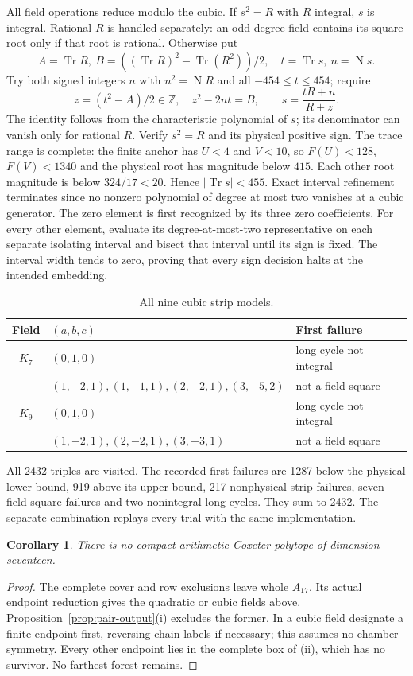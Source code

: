 \documentclass[11pt]{article}
\newtheorem{corollary}[theorem]{Corollary}
\newcommand{\ZZ}{\mathbb Z}
\newcommand{\Tr}{\operatorname{Tr}}
\newcommand{\N}{\operatorname{N}}
\begin{document}
All field operations reduce modulo the cubic. If $s^2=R$ with $R$
integral, $s$ is integral. Rational $R$ is handled separately: an
odd-degree field contains its square root only if that root is
rational. Otherwise put
\[
 A=\Tr R,\ B=((\Tr R)^2-\Tr(R^2))/2,\quad t=\Tr s,\ n=\N s.
\]
Try both signed integers $n$ with $n^2=\N R$ and all
$-454\le t\le454$; require
\[
 z=(t^2-A)/2\in\ZZ,\quad z^2-2nt=B,\qquad
 s=\frac{tR+n}{R+z}.
\]
The identity follows from the characteristic polynomial of $s$;
its denominator can vanish only for rational $R$. Verify $s^2=R$
and its physical positive sign.
The trace range is complete: the finite anchor has $U<4$ and
$V<10$, so $F(U)<128$, $F(V)<1340$ and the physical root
has magnitude below $415$. Each other root magnitude is below
$324/17<20$. Hence $|\Tr s|<455$.
Exact interval refinement terminates since no nonzero polynomial
of degree at most two vanishes at a cubic generator. The zero element
is first recognized by its three zero coefficients. For every other
element, evaluate its degree-at-most-two representative on each separate
isolating interval and bisect that interval until its sign is fixed.
The interval width tends to zero, proving that every sign decision
halts at the intended embedding.

\begin{table}[ht]\centering\small
\begin{tabular}{cll}
\toprule Field&$(a,b,c)$&First failure\\\midrule
$K_7$&$(0,1,0)$&long cycle not integral\\
&$(1,-2,1),(1,-1,1),(2,-2,1),(3,-5,2)$&not a field square\\
$K_9$&$(0,1,0)$&long cycle not integral\\
&$(1,-2,1),(2,-2,1),(3,-3,1)$&not a field square\\\bottomrule
\end{tabular}
\caption{All nine cubic strip models.}\label{tab:cubic}
\end{table}
All 2432 triples are visited. The recorded first failures are
1287 below the physical lower bound, 919 above its upper bound,
217 nonphysical-strip failures, seven field-square failures and
two nonintegral long cycles. They sum to 2432.
The separate combination replays every trial with the same implementation.

\begin{corollary}\label{cor:no17}
There is no compact arithmetic Coxeter polytope of dimension seventeen.
\end{corollary}
\begin{proof}
The complete cover and row exclusions leave whole $A_{17}$.
Its actual endpoint reduction gives the quadratic or cubic fields
above. Proposition~\ref{prop:pair-output}(i) excludes the former.
In a cubic field designate a finite endpoint first, reversing chain
labels if necessary; this assumes no chamber symmetry.
Every other endpoint lies in the complete box of (ii), which has
no survivor. No farthest forest remains.
\end{proof}
\end{document}
